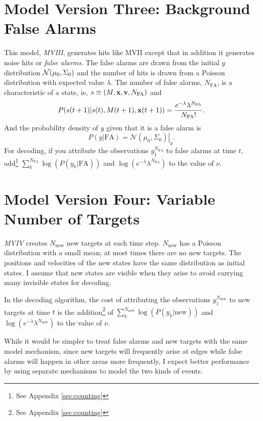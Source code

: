\documentclass[11pt]{article}
\newcommand{\normal}[2]{{\cal N}(#1,#2)}
\newcommand{\NormalE}[3]{{\mathcal{N}}\left.\left(#1,#2\right)\right|_{#3}}
\newcommand{\ti}[2]{{#1}{(#2)}}                         %
\begin{document}
\section{Model Version Three: Background False Alarms}
\label{sec:model3}

This model, \emph{MVIII}, generates hits like MVII except that in
addition it generates noise hits or \emph{false alarms}.  The false
alarms are drawn from the initial $y$ distribution
$\normal{\mu_0}{\Sigma_0}$ and the number of hits is drawn from a
Poisson distribution with expected value $\lambda$.  The number of
false alarms, $N_{\text{FA}}$, is a characteristic of a state, ie, $s
\equiv (M,{\mathbf{x}},{\mathbf{v}},N_{\text{FA}})$ and
\begin{equation}
  \label{eq:2}
  P(\ti{s}{t+1}|\ti{s}{t},\ti{M}{t+1},\ti{\bx}{t+1}) =
  \frac{e^{-\lambda}\lambda^{N_{\text{FA}}}}{N_{\text{FA}}!}.
\end{equation}
And the probability density of $y$ given that it is a false alarm is
\begin{equation*}
  P(y|\text{FA}) = \NormalE{\mu_0}{\Sigma_0}{y}.
\end{equation*}
For decoding, if you attribute the observations $y_1^{N_{\text{FA}}}$
to false alarms at time $t$, add\footnote{See Appendix
  \ref{sec:counting}} $\sum_k^{N_{\text{FA}}} \log(P(y_k|\text{FA}))$
and $\log \left( e^{-\lambda} \lambda^{N_{\text{FA}}} \right)$ to the
value of $\nu$.

\section{Model Version Four: Variable Number of Targets}
\label{sec:model4}

\emph{MVIV} creates $N_{\text{new}}$ new targets at each time step.
$N_{\text{new}}$ has a Poisson distribution with a small mean; at most
times there are no new targets.  The positions and velocities of the
new states have the same distribution as initial states.  I assume
that new states are visible when they arise to avoid carrying many
invisible states for decoding.

In the decoding algorithm, the cost of attributing the observations
$y_1^{N_{\text{new}}}$ to new targets at time $t$ is the
addition\footnote{See Appendix \ref{sec:counting}} of
$\sum_k^{N_{\text{new}}} \log(P(y_k|\text{new}))$ and $\log \left(
  e^{-\lambda} \lambda^{N_{\text{new}}}\right)$ to the value of
$\nu$.

While it would be simpler to treat false alarms and new targets with
the same model mechanism, since new targets will frequently arise at
edges while false alarms will happen in other areas more frequently, I
expect better performance by using separate mechanisms to model the
two kinds of events.
\end{document}
